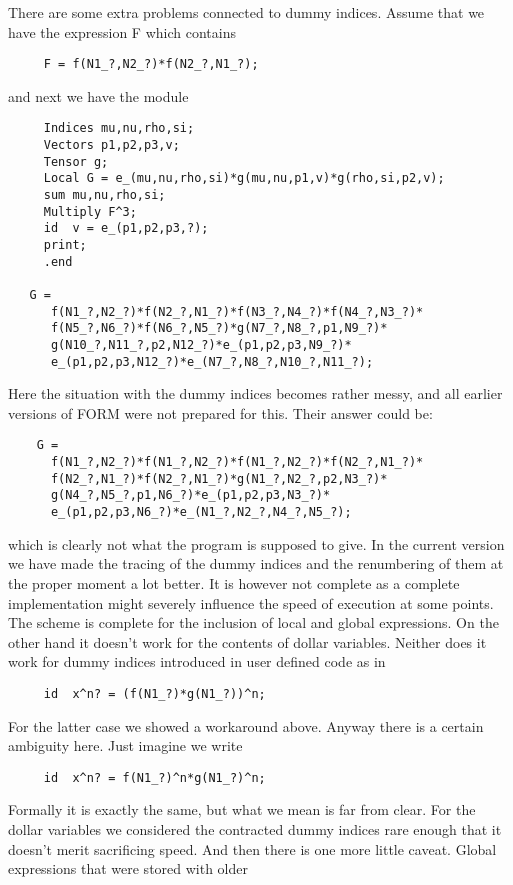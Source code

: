 There are some extra problems connected to dummy indices. Assume that we 
have the expression F which contains
\begin{verbatim}
     F = f(N1_?,N2_?)*f(N2_?,N1_?);
\end{verbatim}
and next we have the module
\begin{verbatim}
     Indices mu,nu,rho,si;
     Vectors p1,p2,p3,v;
     Tensor g;
     Local G = e_(mu,nu,rho,si)*g(mu,nu,p1,v)*g(rho,si,p2,v);
     sum mu,nu,rho,si;
     Multiply F^3;
     id  v = e_(p1,p2,p3,?);
     print;
     .end

   G =
      f(N1_?,N2_?)*f(N2_?,N1_?)*f(N3_?,N4_?)*f(N4_?,N3_?)*
      f(N5_?,N6_?)*f(N6_?,N5_?)*g(N7_?,N8_?,p1,N9_?)*
      g(N10_?,N11_?,p2,N12_?)*e_(p1,p2,p3,N9_?)*
      e_(p1,p2,p3,N12_?)*e_(N7_?,N8_?,N10_?,N11_?);
\end{verbatim}
Here the situation with the dummy indices becomes rather messy, and all 
earlier versions of FORM were not prepared for this. Their answer could be:
\begin{verbatim}
    G =
      f(N1_?,N2_?)*f(N1_?,N2_?)*f(N1_?,N2_?)*f(N2_?,N1_?)*
      f(N2_?,N1_?)*f(N2_?,N1_?)*g(N1_?,N2_?,p2,N3_?)*
      g(N4_?,N5_?,p1,N6_?)*e_(p1,p2,p3,N3_?)*
      e_(p1,p2,p3,N6_?)*e_(N1_?,N2_?,N4_?,N5_?);
\end{verbatim}
which is clearly not what the program is supposed to give. In the current 
version we have made the tracing of the dummy indices and the renumbering 
of them at the proper moment a lot better. It is however not complete as a 
complete implementation might severely influence the speed of execution at 
some points. The scheme is complete for the inclusion of local and global 
expressions. On the other hand it doesn't work for the contents of dollar 
variables. Neither does it work for dummy indices 
introduced in user defined code as in
\begin{verbatim}
     id  x^n? = (f(N1_?)*g(N1_?))^n;
\end{verbatim}
For the latter case we showed a workaround above. Anyway there is a certain 
ambiguity here. Just imagine we write
\begin{verbatim}
     id  x^n? = f(N1_?)^n*g(N1_?)^n;
\end{verbatim}
Formally it is exactly the same, but what we mean is far from clear. For 
the dollar variables we considered the contracted dummy indices rare enough 
that it doesn't merit sacrificing speed. And then there is one more little 
caveat. Global expressions that were stored with older 
